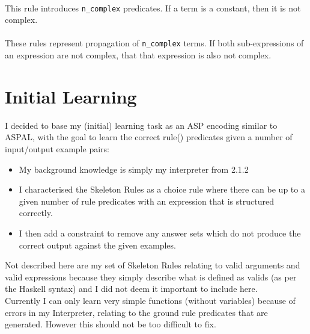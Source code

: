 
\mbox{} \\
This rule introduces \lstinline{n_complex} predicates. If a term is a constant, then it is not complex. \\ %


\mbox{} \\
These rules represent propagation of \lstinline{n_complex} terms. If both sub-expressions of an expression are not complex, that that expression is also not complex. \\ %

\section{Initial Learning}

I decided to base my (initial) learning task as an ASP encoding similar to ASPAL, with the goal to learn the correct rule() predicates given a number of input/output example pairs:

\begin{itemize}
\item My background knowledge is simply my interpreter from 2.1.2
\item I characterised the Skeleton Rules as a choice rule where there can be up to a given number of rule predicates with an expression that is structured correctly. 

\item I then add a constraint to remove any answer sets which do not produce the correct output against the given examples.

\end{itemize}

Not described here are my set of Skeleton Rules relating to valid arguments and valid expressions because they simply describe what is defined as valids (as per the Haskell syntax) and I did not deem it important to include here.\\

Currently I can only learn very simple functions (without variables) because of errors in my Interpreter, relating to the ground rule predicates that are generated. However this should not be too difficult to fix. 

\pagebreak
%
%